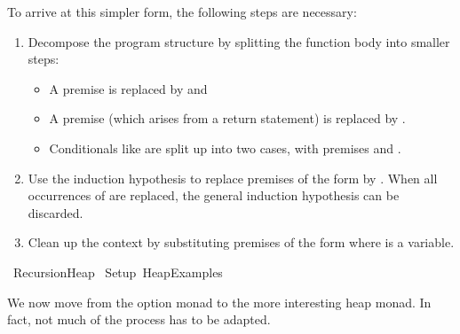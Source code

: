 \documentclass[copyright,creativecommons,sharealike]{eptcs}
\theoremstyle{remark}
\begin{document}
\begin{isabellebody}
\begin{isamarkuptext}
\noindent To arrive at this simpler form, the following steps are necessary:
\begin{enumerate}
\item Decompose the program structure by splitting the function body into
  smaller steps:
  \begin{itemize}
  \item A premise  is replaced by  and 
  \item A premise  (which arises from a return
  statement) is replaced by .
  \item Conditionals like  are
  split up into two cases, with premises  and .
  \end{itemize}
\item Use the induction hypothesis to replace premises of the form
   by . When all occurrences of
   are replaced, the general induction hypothesis can be
  discarded.
\item Clean up the context by substituting premises of the form  where  is a variable.
\end{enumerate}
\end{isamarkuptext}\isamarkuptrue \isadelimtheory
\endisadelimtheory
\isatagtheory
{}\isamarkupfalse \endisatagtheory
{\isafoldtheory}\isadelimtheory
\endisadelimtheory
\end{isabellebody} \begin{isabellebody}\def\isabellecontext{Recursion{\isacharunderscore}Heap}\isadelimtheory
\endisadelimtheory
\isatagtheory
{}\isamarkupfalse \ Recursion{\isacharunderscore}Heap\isanewline
{}\ Setup\ Heap{\isacharunderscore}Examples\isanewline
{}\endisatagtheory
{\isafoldtheory}\isadelimtheory
\endisadelimtheory
\isadelimproof
\endisadelimproof
\isatagproof
\endisatagproof
{\isafoldproof}\isadelimproof
\endisadelimproof
{}
\isamarkuptrue \label{heap_recursion}
\begin{isamarkuptext}We now move from the option monad to the more interesting heap
  monad. In fact, not much of the process has to be adapted.


\end{isamarkuptext}
\end{isabellebody}
\end{document}
